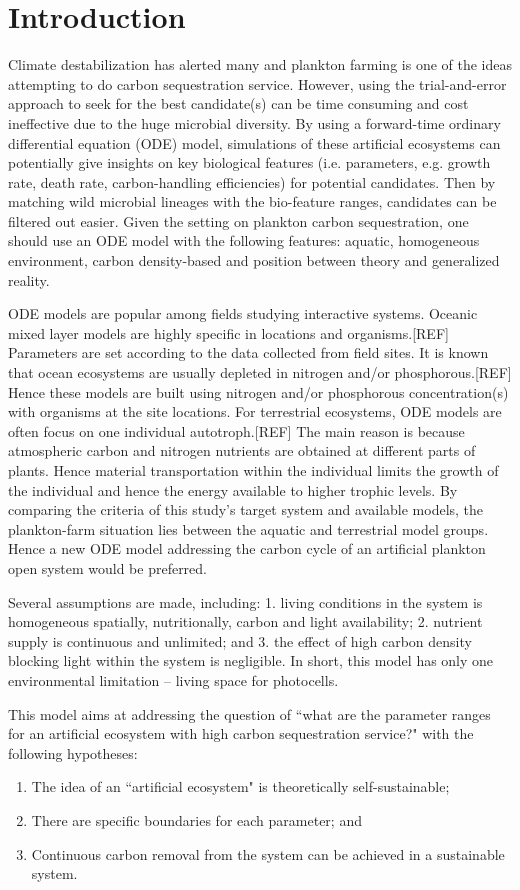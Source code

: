\documentclass[../thesis.tex]{subfiles} %
\begin{document}
\section{Introduction}

Climate destabilization has alerted many and plankton farming is one of the ideas attempting to do carbon sequestration service.  However, using the trial-and-error approach to seek for the best candidate(s) can be time consuming and cost ineffective due to the huge microbial diversity.  By using a forward-time ordinary differential equation (ODE) model, simulations of these artificial ecosystems can potentially give insights on key biological features (i.e. parameters, e.g. growth rate, death rate, carbon-handling efficiencies) for potential candidates.  Then by matching wild microbial lineages with the bio-feature ranges, candidates can be filtered out easier.  Given the setting on plankton carbon sequestration, one should use an ODE model with the following features: aquatic, homogeneous environment, carbon density-based and position between theory and generalized reality.

ODE models are popular among fields studying interactive systems.  Oceanic mixed layer models are highly specific in locations and organisms.[REF]  Parameters are set according to the data collected from field sites.  It is known that ocean ecosystems are usually depleted in nitrogen and/or phosphorous.[REF]  Hence these models are built using nitrogen and/or phosphorous concentration(s) with organisms at the site locations.  For terrestrial ecosystems, ODE models are often focus on one individual autotroph.[REF]  The main reason is because atmospheric carbon and nitrogen nutrients are obtained at different parts of plants.  Hence material transportation within the individual limits the growth of the individual and hence the energy available to higher trophic levels.  By comparing the criteria of this study's target system and available models, the plankton-farm situation lies between the aquatic and terrestrial model groups.  Hence a new ODE model addressing the carbon cycle of an artificial plankton open system would be preferred.

Several assumptions are made, including: 1. living conditions in the system is homogeneous spatially, nutritionally, carbon and light availability; 2. nutrient supply is continuous and unlimited; and 3. the effect of high carbon density blocking light within the system is negligible.  In short, this model has only one environmental limitation -- living space for photocells.

This model aims at addressing the question of ``what are the parameter ranges for an artificial ecosystem with high carbon sequestration service?" with the following hypotheses:

\begin{enumerate}
    \item The idea of an ``artificial ecosystem" is theoretically self-sustainable;
    \item There are specific boundaries for each parameter; and
    \item Continuous carbon removal from the system can be achieved in a sustainable system.
\end{enumerate}
\end{document}
